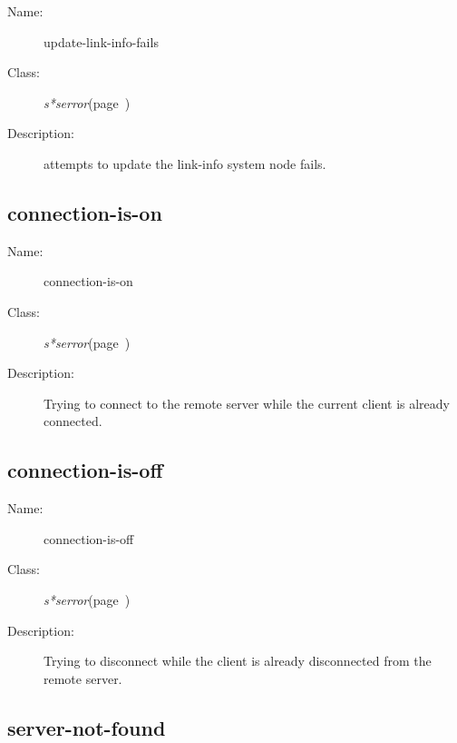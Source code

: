\begin{description}
\item [Name:]  update-link-info-fails

\item [Class:]
{\sl s*serror}\hfill(page~\pageref{s*serror})

\item [Description:] 
attempts to update the link-info system node fails.



\end{description}
\horizontalline

\subsection{connection-is-on}
\label{connection-is-on}

\begin{description}
\item [Name:]  connection-is-on


\item [Class:]
{\sl s*serror}\hfill(page~\pageref{s*serror})


\item [Description:]
Trying to connect to the remote server while the
current client is already connected.


\end{description}
\horizontalline

\subsection{connection-is-off}
\label{connection-is-off}

\begin{description}

\item [Name:]  connection-is-off


\item [Class:]
{\sl s*serror}\hfill(page~\pageref{s*serror})


\item [Description:]
Trying to disconnect while the client is already
disconnected from the remote server.


\end{description}
\horizontalline

\subsection{server-not-found}
\label{server-not-found}

